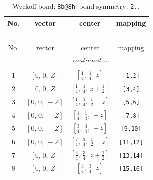 \documentclass[fleqn,8pt]{jsarticle}
\begin{document}
\renewcommand{\arraystretch}{1.2}
\begin{longtable}{cccc}
\caption{Wyckoff bond: {\tt 8b@8h}, bond symmetry: {\tt 2..}}
 \\
 \hline \hline
No. & vector & center & mapping \\ \hline \endfirsthead

\multicolumn{3}{l}{\tablename\ \thetable{}} \\
 \hline \hline
No. & vector & center & mapping \\ \hline \endhead

 \hline \hline
\multicolumn{3}{r}{\footnotesize\it continued ...} \\ \endfoot

 \hline \hline
\multicolumn{3}{r}{} \\ \endlastfoot

1 & $\left[ 0,\, 0,\, Z \right]$ & $\left[ \frac{1}{4},\, \frac{1}{4},\, z \right]$ & {\tt [1,2]} \\ \hline
2 & $\left[ 0,\, 0,\, Z \right]$ & $\left[ \frac{1}{4},\, \frac{1}{4},\, z + \frac{1}{2} \right]$ & {\tt [3,4]} \\ \hline
3 & $\left[ 0,\, 0,\, - Z \right]$ & $\left[ \frac{1}{4},\, \frac{1}{4},\, \frac{1}{2} - z \right]$ & {\tt [5,6]} \\ \hline
4 & $\left[ 0,\, 0,\, - Z \right]$ & $\left[ \frac{1}{4},\, \frac{1}{4},\, - z \right]$ & {\tt [7,8]} \\ \hline
5 & $\left[ 0,\, 0,\, - Z \right]$ & $\left[ \frac{3}{4},\, \frac{3}{4},\, - z \right]$ & {\tt [9,10]} \\ \hline
6 & $\left[ 0,\, 0,\, - Z \right]$ & $\left[ \frac{3}{4},\, \frac{3}{4},\, \frac{1}{2} - z \right]$ & {\tt [11,12]} \\ \hline
7 & $\left[ 0,\, 0,\, Z \right]$ & $\left[ \frac{3}{4},\, \frac{3}{4},\, z + \frac{1}{2} \right]$ & {\tt [13,14]} \\ \hline
8 & $\left[ 0,\, 0,\, Z \right]$ & $\left[ \frac{3}{4},\, \frac{3}{4},\, z \right]$ & {\tt [15,16]} \\
\end{longtable}
\renewcommand{\arraystretch}{1.2}
\end{document}

